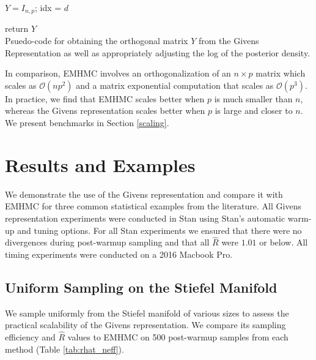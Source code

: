 \documentclass[ba]{imsart}
\numberwithin{equation}{section}
\theoremstyle{plain}
\begin{document}
\begin{algorithm}[h]
\SetAlgoLined
\KwIn{$\theta$}
$Y = I_{n,p}$;
 idx = $d$
 
return $Y$
\\
\caption{Psuedo-code for obtaining the orthogonal matrix $Y$ from the Givens Representation as well as appropriately adjusting the log of the posterior density.}
 \label{alg:givens}
\end{algorithm}

\noindent In comparison, EMHMC involves an orthogonalization of an $n \times p$ matrix which scales as $\mathcal{O}(np^2)$ and a matrix exponential computation that scales as $\mathcal{O}(p^3)$. In practice, we find that EMHMC scales better when $p$ is much smaller than $n$, whereas the Givens representation scales better when $p$ is large and closer to $n$. We present benchmarks in Section \ref{scaling}.

\section{Results and Examples} \label{examples}

We demonstrate the use of the Givens representation and compare it with EMHMC for three common statistical examples from the literature. All Givens representation experiments were conducted in Stan using Stan's automatic warm-up and tuning options. For all Stan experiments we ensured that there were no divergences during post-warmup sampling and that all $\hat{R}$ were $1.01$ or below. All timing experiments were conducted on a 2016 Macbook Pro.


\subsection{Uniform Sampling on the Stiefel Manifold} \label{scaling_examples}
We sample uniformly from the Stiefel manifold of various sizes to assess the practical scalability of the Givens representation. We compare its sampling efficiency and $\hat{R}$ values to EMHMC on 500 post-warmup samples from each method (Table \ref{tab:rhat_neff}).  
\end{document}
